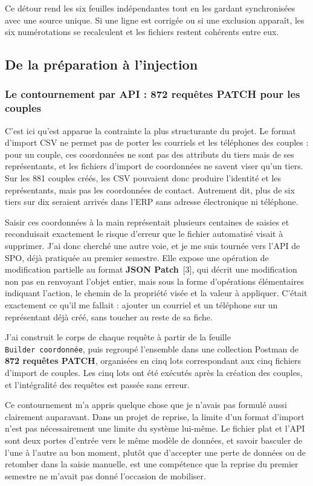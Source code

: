 Ce détour rend les six feuilles indépendantes tout en les gardant synchronisées avec une source
unique. Si une ligne est corrigée ou si une exclusion apparaît, les six numérotations se
recalculent et les fichiers restent cohérents entre eux.

\subsection{De la préparation à l'injection}

\subsubsection{Le contournement par API : 872 requêtes PATCH pour les couples}

C'est ici qu'est apparue la contrainte la plus structurante du projet. Le format d'import CSV
ne permet pas de porter les courriels et les téléphones des couples : pour un couple, ces
coordonnées ne sont pas des attributs du tiers mais de ses représentants, et les fichiers
d'import de coordonnées ne savent viser qu'un tiers. Sur les 881 couples créés, les CSV
pouvaient donc produire l'identité et les représentants, mais pas les coordonnées de contact.
Autrement dit, plus de six tiers sur dix seraient arrivés dans l'ERP sans adresse électronique
ni téléphone.

Saisir ces coordonnées à la main représentait plusieurs centaines de saisies et reconduisait
exactement le risque d'erreur que le fichier automatisé visait à supprimer. J'ai donc cherché
une autre voie, et je me suis tournée vers l'API de SPO, déjà pratiquée au premier semestre.
Elle expose une opération de modification partielle au format \textbf{JSON Patch}~[3], qui
décrit une modification non pas en renvoyant l'objet entier, mais sous la forme d'opérations
élémentaires indiquant l'action, le chemin de la propriété visée et la valeur à appliquer.
C'était exactement ce qu'il me fallait : ajouter un courriel et un téléphone sur un représentant
déjà créé, sans toucher au reste de sa fiche.

J'ai construit le corps de chaque requête à partir de la feuille \texttt{Builder\ coordonnée},
puis regroupé l'ensemble dans une collection Postman de \textbf{872 requêtes PATCH}, organisées
en cinq lots correspondant aux cinq fichiers d'import de couples. Les cinq lots ont été exécutés
après la création des couples, et l'intégralité des requêtes est passée sans erreur.

Ce contournement m'a appris quelque chose que je n'avais pas formulé aussi clairement
auparavant. Dans un projet de reprise, la limite d'un format d'import n'est pas nécessairement
une limite du système lui-même. Le fichier plat et l'API sont deux portes d'entrée vers le même
modèle de données, et savoir basculer de l'une à l'autre au bon moment, plutôt que d'accepter
une perte de données ou de retomber dans la saisie manuelle, est une compétence que la reprise
du premier semestre ne m'avait pas donné l'occasion de mobiliser.

